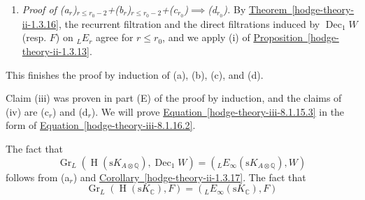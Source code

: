 \begin{enumerate}
      
 \item[(E)]
        \emph{Proof of (a\({}_r\))\({}_{r\leqslant  r_0-2}\)+(b\({}_r\))\({}_{r\leqslant  r_0-2}\)+(c\({}_{r_0}\))\(\implies \)(d\({}_{r_0}\)).}
        By \hyperref[hodge-theory-ii-1.3.16]{Theorem~\ref*{hodge-theory-ii-1.3.16}}, the recurrent filtration and the direct filtrations induced by \(\operatorname {Dec}_1W\) (resp. \(F\)) on \({}_LE_r\) agree for \(r\leqslant  r_0\), and we apply (i) of \hyperref[hodge-theory-ii-1.3.13]{Proposition~\ref*{hodge-theory-ii-1.3.13}}.
      

    \end{enumerate}\par{}This finishes the proof by induction of (a), (b), (c), and (d).\par{}Claim (iii) was proven in part (E) of the proof by induction, and the claims of (iv) are (c\({}_r\)) and (d\({}_r\)).
    We will prove \hyperref[hodge-theory-iii-8.1.15.3]{Equation~\ref*{hodge-theory-iii-8.1.15.3}} in the form of \hyperref[hodge-theory-iii-8.1.16.2]{Equation~\ref*{hodge-theory-iii-8.1.16.2}}.\par{}The fact that
    \[       \operatorname {Gr}_L(\operatorname {H}(\mathrm {s} K_{A\otimes \mathbb {Q}}),\operatorname {Dec}_1W)       = ({}_LE_\infty (\mathrm {s} K_{A\otimes \mathbb {Q}}),W)     \]
    follows from (a\({}_r\)) and \hyperref[hodge-theory-ii-1.3.17]{Corollary~\ref*{hodge-theory-ii-1.3.17}}.
    The fact that
    \[       \operatorname {Gr}_L(\operatorname {H}(\mathrm {s} K_\mathbb {C}),F)       = ({}_LE_\infty (\mathrm {s} K_\mathbb {C}),F)     \]
